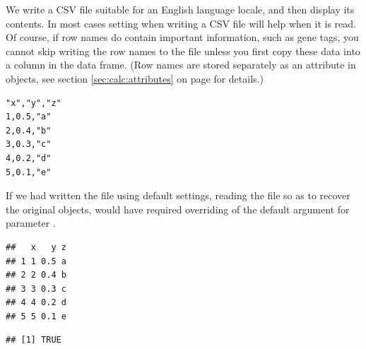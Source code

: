 \documentclass[krantz2]{krantz}\usepackage{knitr}%
\begin{document}
We write a CSV file suitable for an English language locale, and then display its contents. In most cases setting  when writing a CSV file will help when it is read. Of course, if row names do contain important information, such as gene tags, you cannot skip writing the row names to the file unless you first copy these data into a column in the data frame. (Row names are stored separately as an attribute in  objects, see section \ref{sec:calc:attributes} on page \pageref{sec:calc:attributes} for details.)
\begin{knitrout}\footnotesize
{}\color{fgcolor}\begin{kframe}
\begin{alltt}
  \hlstd{=} \hlstd{,}  \hlstd{=} \hlstd{)}
\hlstd{(}\hlstd{,}  \hlstd{=} \hlstd{)}
\end{alltt}
\end{kframe}
\end{knitrout}

\begin{knitrout}\footnotesize
{}\color{fgcolor}\begin{kframe}
\begin{verbatim}
"x","y","z"
1,0.5,"a"
2,0.4,"b"
3,0.3,"c"
4,0.2,"d"
5,0.1,"e"
\end{verbatim}
\end{kframe}
\end{knitrout}

If we had written the file using default settings, reading the file so as to recover the original objects, would have required overriding of the default argument for parameter .
\begin{knitrout}\footnotesize
{}\color{fgcolor}\begin{kframe}
\begin{alltt}
 \hlkwb{<-} \hlstd{(} \hlstd{=} \hlstd{)}
\end{alltt}
\begin{verbatim}
##   x   y z
## 1 1 0.5 a
## 2 2 0.4 b
## 3 3 0.3 c
## 4 4 0.2 d
## 5 5 0.1 e
\end{verbatim}
\begin{alltt}
  \hlstd{=} \hlstd{)}
\end{alltt}
\begin{verbatim}
## [1] TRUE
\end{verbatim}
\end{kframe}
\end{knitrout}
\end{document}
